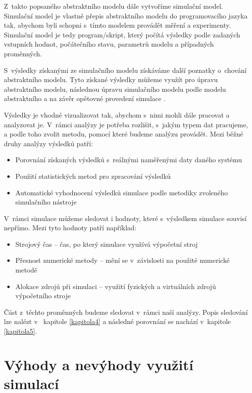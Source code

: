 Z~takto popsaného abstraktního modelu dále vytvoříme simulační model. Simulační model je vlastně přepis abstraktního modelu do programovacího jazyka tak, abychom byli schopni s~tímto modelem provádět měření a experimenty. Simulační model je tedy program/skript, který počítá výsledky podle zadaných vstupních hodnot, počátečního stavu, parametrů modelu a případných proměnných.

S~výsledky získanými ze simulačního modelu získáváme další poznatky o~chování abstraktního modelu. Tyto získané výsledky můžeme využít pro úpravu abstraktního modelu, následnou úpravu simulačního modelu podle modelu abstraktního a na závěr opětovné provedení simulace \cite{IMS-skripta}.

Výsledky je vhodné vizualizovat tak, abychom s~nimi mohli dále pracovat a analyzovat je. V~rámci analýzy je potřeba rozlišit, s~jakým typem dat pracujeme, a podle toho zvolit metodu, pomocí které budeme analýzu provádět. Mezi běžné druhy analýzy výsledků patří:
\begin{itemize}
    \item Porovnání získaných výsledků s~reálnými naměřenými daty daného systému
    \item Použití statistických metod pro zpracování výsledků
    \item Automatické vyhodnocení výsledků simulace podle metodiky zvoleného simulačního nástroje
\end{itemize}

V~rámci simulace můžeme sledovat i hodnoty, které s~výsledkem simulace souvisí nepřímo. Mezi tyto hodnoty patří například:
\begin{itemize}
    \item Strojový čas -- čas, po který simulace využívá výpočetní stroj
    \item Přesnost numerické metody -- mění se v~závislosti na použité numerické metodě
    \item Alokace zdrojů při simulaci -- využití fyzických a virtuálních zdrojů výpočetního stroje
\end{itemize}


Část z~těchto proměnných budeme sledovat v~rámci naší analýzy. Popis sledování lze nalézt v~ kapitole \ref{kapitola4} a následné porovnání se nachází v~kapitole \ref{kapitola5}.

\section{Výhody a nevýhody využití simulací}


